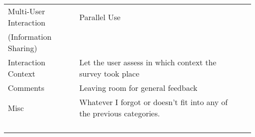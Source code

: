 \begin{tabular}{llll}
Multi-User Interaction                    & Parallel Use                                                          &                                              &                         \\
(Information Sharing)                     &                                                                       &                                              &                         \\
Interaction Context                       & Let the user assess in which context the survey took place            &                                              &                         \\
Comments                                  & Leaving room for general feedback                                     &                                              &                         \\
Misc                                      & Whatever I forgot or doesn't fit into any of the previous categories. &                                              &                         \\
                                          &                                                                       &                                              &                         \\
                                          &                                                                       &                                              &                         \\
                                          &                                                                       &                                              &                         \\
                                          &                                                                       &                                              &                        
\bottomrule
\end{tabular}